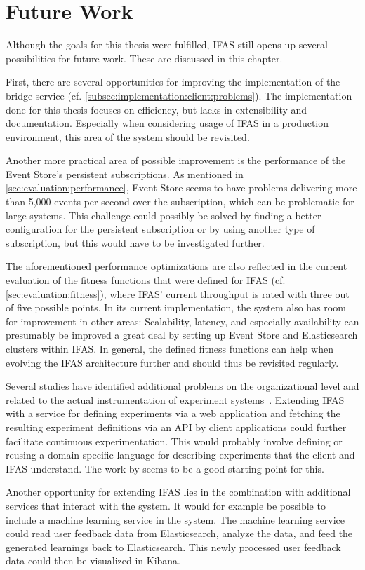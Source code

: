 %
\chapter{Future Work}
\label{ch:future-work}

Although the goals for this thesis were fulfilled, \ac{IFAS} still opens up several possibilities for future work.
These are discussed in this chapter.

First, there are several opportunities for improving the implementation of the bridge service (cf. \cref{subsec:implementation:client:problems}).
The implementation done for this thesis focuses on efficiency, but lacks in extensibility and documentation.
Especially when considering usage of \ac{IFAS} in a production environment, this area of the system should be revisited.

Another more practical area of possible improvement is the performance of the Event Store's persistent subscriptions.
As mentioned in \cref{sec:evaluation:performance}, Event Store seems to have problems delivering more than 5,000 events per second over the subscription, which can be problematic for large systems.
This challenge could possibly be solved by finding a better configuration for the persistent subscription or by using another type of subscription, but this would have to be investigated further.

The aforementioned performance optimizations are also reflected in the current evaluation of the fitness functions that were defined for \ac{IFAS} (cf. \cref{sec:evaluation:fitness}), where \ac{IFAS}' current throughput is rated with three out of five possible points.
In its current implementation, the system also has room for improvement in other areas:
Scalability, latency, and especially availability can presumably be improved a great deal by setting up Event Store and Elasticsearch clusters within \ac{IFAS}.
In general, the defined fitness functions can help when evolving the \ac{IFAS} architecture further and should thus be revisited regularly.

Several studies have identified additional problems on the organizational level and related to the actual instrumentation of experiment systems~\cite{Lindgren2015,lindgren2015software,gutbrod2017software}.
Extending \ac{IFAS} with a service for defining experiments via a web application and fetching the resulting experiment definitions via an \ac{API} by client applications could further facilitate continuous experimentation.
This would probably involve defining or reusing a domain-specific language for describing experiments that the client and \ac{IFAS} understand.
The work by \citet{Bakshy2014} seems to be a good starting point for this.

Another opportunity for extending \ac{IFAS} lies in the combination with additional services that interact with the system.
It would for example be possible to include a machine learning service in the system.
The machine learning service could read user feedback data from Elasticsearch, analyze the data, and feed the generated learnings back to Elasticsearch.
This newly processed user feedback data could then be visualized in Kibana.
